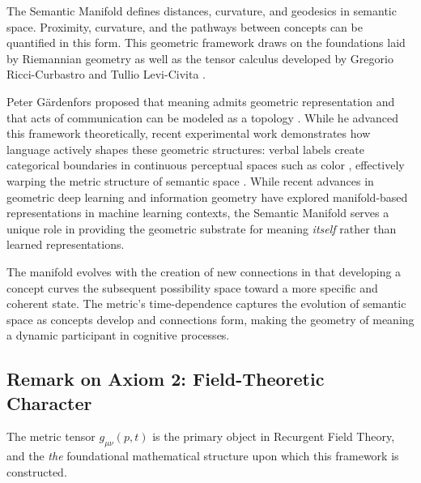 The Semantic Manifold defines distances, curvature, and geodesics in semantic space. Proximity, curvature, and the pathways between concepts can be quantified in this form. This geometric framework draws on the foundations laid by Riemannian geometry \autocite{Riemann1868} as well as the tensor calculus developed by Gregorio Ricci-Curbastro and Tullio Levi-Civita \autocite{RicciLeviCivita1901}.

Peter Gärdenfors proposed that meaning admits geometric representation and that acts of communication can be modeled as a topology \autocite{Gardenfors2000, Gardenfors2014}. While he advanced this framework theoretically, recent experimental work demonstrates how language actively shapes these geometric structures: verbal labels create categorical boundaries in continuous perceptual spaces such as color \autocite{ForderLupyan2019}, effectively warping the metric structure of semantic space \autocite{LupyanAbdelRahmanBoroditskyClark2020}. While recent advances in geometric deep learning \autocite{Bronstein2021} and information geometry \autocite{Amari2016} have explored manifold-based representations in machine learning contexts, the Semantic Manifold serves a unique role in providing the geometric substrate for meaning \textit{itself} rather than learned representations.

The manifold evolves with the creation of new connections in that developing a concept curves the subsequent possibility space toward a more specific and coherent state. The metric's time-dependence captures the evolution of semantic space as concepts develop and connections form, making the geometry of meaning a dynamic participant in cognitive processes.


\subsection{Remark on Axiom 2: Field-Theoretic Character}
\label{1.3.2:remark_1_2}

The metric tensor \(g_{\mu\nu}(p,t)\) is the primary object in Recurgent Field Theory, and the \textit{the} foundational mathematical structure upon which this framework is constructed.

